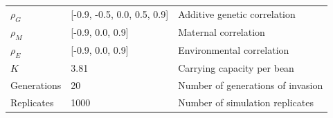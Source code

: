 \documentclass[11pt]{article}
\begin{document}
\begin{table}[h]
\begin{tabularx}{0.95\linewidth}{llX}
$\rho_{G}$   & [-0.9, -0.5, 0.0, 0.5, 0.9]        & Additive genetic correlation          \\
$\rho_{M}$   & [-0.9, 0.0, 0.9]        & Maternal correlation          \\
$\rho_{E}$   & [-0.9, 0.0, 0.9]       & Environmental correlation             \\
$K$          & 3.81                                   & Carrying capacity per bean                          \\
Generations  & 20                                     & Number of generations of invasion                 \\
Replicates   & 1000                                   & Number of simulation replicates                   \\ \bottomrule
\end{tabularx}
\end{table}

\end{document}
